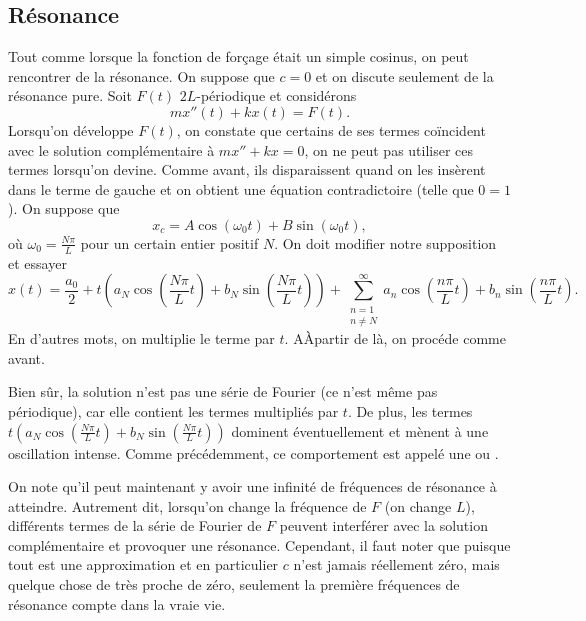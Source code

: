 \subsection{Résonance}

Tout comme lorsque la fonction de forçage était un simple cosinus, on peut rencontrer de la 
résonance. On suppose  que $ c = 0 $ et on discute seulement de la résonance pure.
Soit $ F (t) $ $ 2L $-périodique et considérons
\begin{equation*}
m x''(t) + k x (t) = F(t) .
\end{equation*}
Lorsqu'on développe $ F (t) $, on constate que certains de ses termes coïncident avec le
solution complémentaire à $ mx '' + kx = 0 $, on ne peut pas utiliser ces termes lorsqu'on
devine. Comme avant, ils disparaissent quand on les insèrent dans le terme de gauche et on obtient une équation contradictoire (telle que $ 0 = 1 $). On suppose que
\begin{equation*}
x_c = A \cos (\omega_0 t) + B \sin (\omega_0 t), 
\end{equation*}
où $\omega_0 = \frac{N \pi}{L}$ pour un certain entier positif $N$.
On doit modifier notre supposition et essayer  
\begin{equation*}
x(t) = \frac{a_0}{2} +
t \left(
a_N \cos \left( \frac{N \pi}{L} t \right) +
b_N \sin \left( \frac{N \pi}{L} t \right) \right) +
\sum_{\substack{n=1\\n\not= N}}^\infty
a_n \cos \left( \frac{n \pi}{L} t \right) +
b_n \sin \left( \frac{n \pi}{L} t \right) .
\end{equation*}
En d'autres mots, on multiplie le terme par $ t $. AÀpartir de là, on
procéde comme avant.

Bien sûr, la solution n'est pas une série de Fourier (ce n'est même pas
périodique), car elle contient les termes multipliés par $ t $. De plus, les
termes
$t \left( a_N \cos \left( \frac{N \pi}{L} t \right) +
b_N \sin \left( \frac{N \pi}{L} t \right) \right)$ dominent éventuellement et mènent à une oscillation intense. Comme précédemment, ce comportement est appelé une  \emph{} ou  \emph{}.

On note qu'il peut maintenant y avoir une infinité de fréquences de résonance à atteindre.
Autrement dit, lorsqu'on change la fréquence de $ F $ (on change $ L $),  différents termes de la série de Fourier de $ F $ peuvent interférer avec la solution complémentaire et provoquer une résonance.
Cependant, il faut noter que puisque tout est une approximation et en
particulier $ c $ n'est jamais réellement zéro, mais quelque chose de très proche de zéro,
seulement la première fréquences de résonance compte dans la vraie vie.

